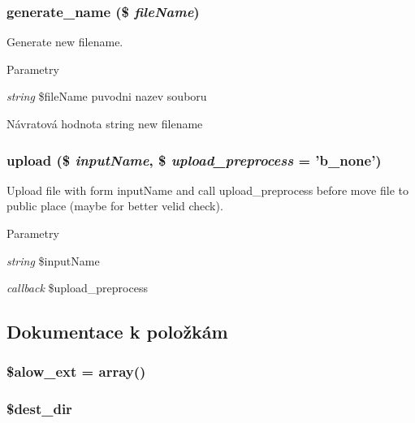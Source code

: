 \subsubsection[{generate\_\-name}]{\setlength{\rightskip}{0pt plus 5cm}generate\_\-name (\$ {\em fileName})}\label{d4/d3b/class_uploader_ae190252d35464175e51cdd3cf430e534}
Generate new filename. 
\begin{DoxyParams}{Parametry}
\item[{\em string}]\$fileName puvodni nazev souboru \end{DoxyParams}
\begin{DoxyReturn}{Návratová hodnota}
string new filename 
\end{DoxyReturn}
\subsubsection[{upload}]{\setlength{\rightskip}{0pt plus 5cm}upload (\$ {\em inputName}, \/  \$ {\em upload\_\-preprocess} = {\ttfamily 'b\_\-none'})}\label{d4/d3b/class_uploader_a0362e48fc390880c79c71d81c908ab86}
Upload file with form inputName and call upload\_\-preprocess before move file to public place (maybe for better velid check). 
\begin{DoxyParams}{Parametry}
\item[{\em string}]\$inputName \item[{\em callback}]\$upload\_\-preprocess \end{DoxyParams}


\subsection{Dokumentace k položkám}
\subsubsection[{\$alow\_\-ext}]{\setlength{\rightskip}{0pt plus 5cm}\$alow\_\-ext = array()\hspace{0.3cm}{\ttfamily  [private]}}\label{d4/d3b/class_uploader_a484692ba852cdd663733c5b6bc17753c}
\subsubsection[{\$dest\_\-dir}]{\setlength{\rightskip}{0pt plus 5cm}\$dest\_\-dir\hspace{0.3cm}{\ttfamily  [private]}}\label{d4/d3b/class_uploader_a8d63eb8e7942d2cb2b69ed7aa9ae131b}
